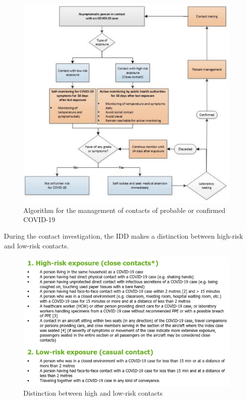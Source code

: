 \begin{figure}[H]
	\begin{center}
	    \includegraphics[scale=0.7]{imgs/algo_eu.png}
 		\caption{Algorithm for the management of contacts of probable or confirmed COVID-19}
 		\label{fig:algo_eu}
	\end{center}
\end{figure}

During the contact investigation, the IDD makes a distinction between high-risk and low-risk contacts. 

\begin{figure}[H]
	\begin{center}
	    \includegraphics[scale=0.5]{imgs/hi_low.png}
 		\caption{Distinction between high and low-risk contacts}
 		\label{fig:hi_low}
	\end{center}
\end{figure}

